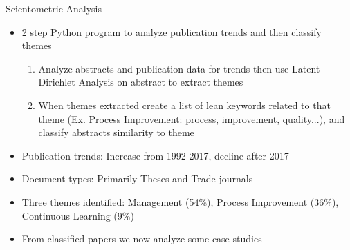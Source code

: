 \documentclass[aspectratio=169,11pt,xcolor={dvipsnames},hyperref={pdftex,pdfpagemode=UseNone,hidelinks,pdfdisplaydoctitle=true},usepdftitle=false]{beamer}
\begin{document}
    \begin{frame}{Scientometric Analysis}
      \begin{itemize}
        \item 2 step Python program to analyze publication trends and then classify themes
        \begin{enumerate}
          \item Analyze abstracts and publication data for trends then use Latent Dirichlet Analysis on abstract to extract themes
          \item When themes extracted create a list of lean keywords related to that theme (Ex. Process Improvement: process, improvement, quality...), and classify abstracts similarity to theme
        \end{enumerate}
        \item Publication trends: Increase from 1992-2017, decline after 2017
        \item Document types: Primarily Theses and Trade journals
        \item Three themes identified: Management (54\%), Process Improvement (36\%), Continuous Learning (9\%)
        \item From classified papers we now analyze some case studies
      \end{itemize}
    \end{frame}
\end{document}
